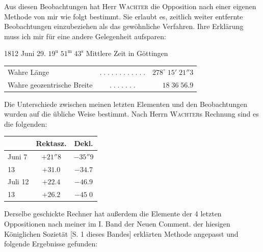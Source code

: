 \par\indent Aus diesen Beobachtungen hat Herr \textsc{Wachter} die Opposition nach einer eigenen Methode von mir wie folgt bestimmt. Sie erlaubt es, zeitlich weiter entfernte Beobachtungen einzubeziehen als das gewöhnliche Verfahren. Ihre Erklärung muss ich mir für eine andere Gelegenheit aufsparen:

1812 Juni 29. $19^{\mathrm u}\;51^{\mathrm m}\;43^{\mathrm s}$ Mittlere Zeit in Göttingen

\begin{center}\fontsize{10}{12}\selectfont\setlength{\tabcolsep}{2pt}\renewcommand{\arraystretch}{1.15}\begin{tabular}{lcr}
Wahre Länge & $.\;.\;.\;.\;.\;.\;.\;.\;.\;.\;.\;.$ & $278^\circ\;15'\;21''3$\\
Wahre geozentrische Breite & $.\;.\;.\;.\;.\;.\;.$ & $18\;36\;56.9$\\
\end{tabular}\end{center}

\par\indent Die Unterschiede zwischen meinen letzten Elementen und den Beobachtungen wurden auf die übliche Weise bestimmt. Nach Herrn \textsc{Wachter}s Rechnung sind es die folgenden:

\begin{center}\fontsize{10}{12}\selectfont\setlength{\tabcolsep}{7pt}\renewcommand{\arraystretch}{1.15}\begin{tabular}{l|c|c}
& Rektasz. & Dekl.\\\hline
Juni 7 & $+21''8$ & $-35''9$\\
13 & $+31.0$ & $-34.7$\\
Juli 12 & $+22.4$ & $-46.9$\\
13 & $+26.2$ & $-45\;0$\\
\end{tabular}\end{center}

\par\indent Derselbe geschickte Rechner hat außerdem die Elemente der 4 letzten Oppositionen nach meiner im I. Band der Neuen Comment. der hiesigen Königlichen Sozietät [S. 1 dieses Bandes] erklärten Methode angepasst und folgende Ergebnisse gefunden:

